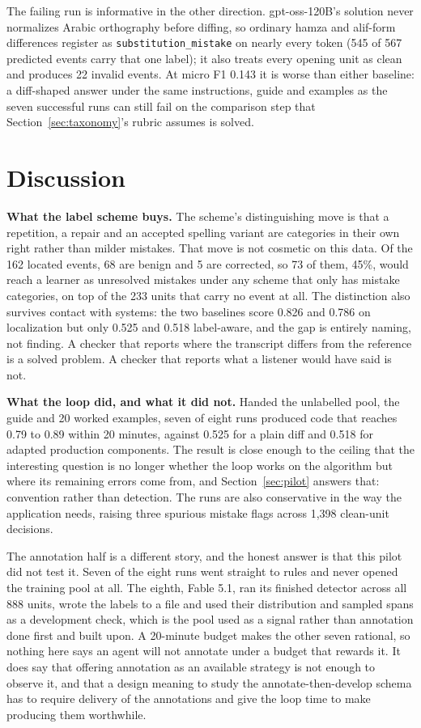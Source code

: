\documentclass{article}
\begin{document}
The failing run is informative in the other direction. gpt-oss-120B's solution never normalizes Arabic orthography before diffing, so ordinary hamza and alif-form differences register as \texttt{substitution\_mistake} on nearly every token (545 of 567 predicted events carry that one label); it also treats every opening unit as clean and produces 22 invalid events. At micro F1 0.143 it is worse than either baseline: a diff-shaped answer under the same instructions, guide and examples as the seven successful runs can still fail on the comparison step that Section~\ref{sec:taxonomy}'s rubric assumes is solved.

\section{Discussion}
\textbf{What the label scheme buys.} The scheme's distinguishing move is that a repetition, a repair and an accepted spelling variant are categories in their own right rather than milder mistakes. That move is not cosmetic on this data. Of the 162 located events, 68 are benign and 5 are corrected, so 73 of them, 45\%, would reach a learner as unresolved mistakes under any scheme that only has mistake categories, on top of the 233 units that carry no event at all. The distinction also survives contact with systems: the two baselines score 0.826 and 0.786 on localization but only 0.525 and 0.518 label-aware, and the gap is entirely naming, not finding. A checker that reports where the transcript differs from the reference is a solved problem. A checker that reports what a listener would have said is not.

\textbf{What the loop did, and what it did not.} Handed the unlabelled pool, the guide and 20 worked examples, seven of eight runs produced code that reaches 0.79 to 0.89 within 20 minutes, against 0.525 for a plain diff and 0.518 for adapted production components. The result is close enough to the ceiling that the interesting question is no longer whether the loop works on the algorithm but where its remaining errors come from, and Section~\ref{sec:pilot} answers that: convention rather than detection. The runs are also conservative in the way the application needs, raising three spurious mistake flags across 1{,}398 clean-unit decisions.

The annotation half is a different story, and the honest answer is that this pilot did not test it. Seven of the eight runs went straight to rules and never opened the training pool at all. The eighth, Fable 5.1, ran its finished detector across all 888 units, wrote the labels to a file and used their distribution and sampled spans as a development check, which is the pool used as a signal rather than annotation done first and built upon. A 20-minute budget makes the other seven rational, so nothing here says an agent will not annotate under a budget that rewards it. It does say that offering annotation as an available strategy is not enough to observe it, and that a design meaning to study the annotate-then-develop schema has to require delivery of the annotations and give the loop time to make producing them worthwhile.
\end{document}
